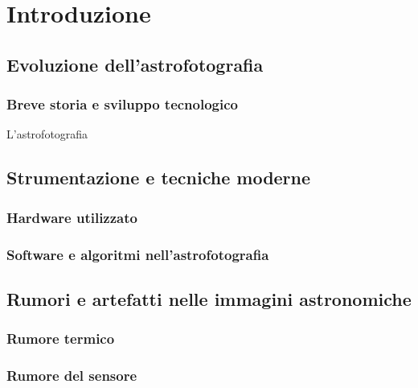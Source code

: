 \chapter{Introduzione} \label{chap:introduction}

\section{Evoluzione dell'astrofotografia}

\subsection{Breve storia e sviluppo tecnologico}
L'astrofotografia

\section{Strumentazione e tecniche moderne}

\subsection{Hardware utilizzato}

\subsection{Software e algoritmi nell'astrofotografia}

\section{Rumori e artefatti nelle immagini astronomiche}

\subsection{Rumore termico}

\subsection{Rumore del sensore}

\cleardoublepage